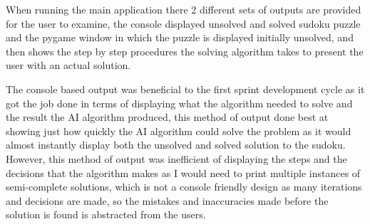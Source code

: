 \documentclass[]{final_report}
\begin{document}
When running the main application there 2 different sets of outputs are provided for the user to examine, the console displayed unsolved and solved sudoku puzzle and the pygame window in which the puzzle is displayed initially unsolved, and then shows the step by step procedures the solving algorithm takes to present the user with an actual solution. 

The console based output was beneficial to the first sprint development cycle as it got the job done in terms of displaying what the algorithm needed to solve and the result the AI algorithm produced, this method of output done best at showing just how quickly the AI algorithm could solve the problem as it would almost instantly display both the unsolved and solved solution to the sudoku. However, this method of output was inefficient of displaying the steps and the decisions that the algorithm makes as I would need to print multiple instances of semi-complete solutions, which is not a console friendly design as many iterations and decisions are made, so the mistakes and inaccuracies made before the solution is found is abstracted from the users. 
\end{document}
